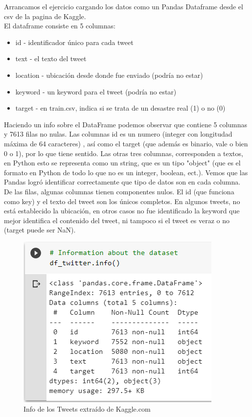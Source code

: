 \documentclass[]{article}
\begin{document}
Arrancamos el ejercicio cargando los datos como un Pandas Dataframe desde el csv de la pagina de Kaggle. \\

El dataframe consiste en 5 columnas:
\begin{itemize}

\item id - identificador \'unico para cada tweet
\item text - el texto del tweet
\item location - ubicación desde donde fue enviado (podr\'ia no estar)
\item keyword - un keyword para el tweet  (podr\'ia no estar)
\item target - en train.csv, indica si se trata de un desastre real  (1) o no (0)
\end{itemize}
 
 Haciendo un info sobre el DataFrame podemos observar que contiene 5 columnas y 7613 filas no nulas. Las columnas id es un numero (integer con longitudad m\'axima de 64 caracteres) , as\'i como el target (que adem\'as es binario, vale o bien 0 o 1), por lo que tiene sentido. Las otras tres columnas, corresponden a textos, en Python esto se representa como un string, que es un tipo "object" (que es  el formato en Python de todo lo que no es un integer, boolean, ect.). Vemos que las Pandas logr\'o identificar correctamente que tipo de datos son en cada columna. \\
 De las filas, algunas columnas tienen componentes nulos. El id (que funciona como key) y el texto del tweet son los \'unicos completos. En algunos tweets, no est\'a establecido la ubicaci\'on, en otros casos no fue identificado la keyword que mejor identifica el contenido del tweet, ni tampoco si el tweet es veraz o no (target puede ser NaN). 
 
 \begin{figure}[H]
 	\centering
 	\includegraphics[width=0.75\linewidth]{df_twitter.info}
 	\caption[]{Info de los Tweets extra\'ido de Kaggle.com}
 \end{figure}
\end{document}
